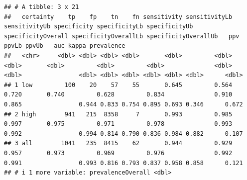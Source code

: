 \documentclass[
]{article}
\begin{document}
\begin{verbatim}
## # A tibble: 3 x 21
##   certainty    tp    fp    tn    fn sensitivity sensitivityLb sensitivityUb specificity specificityLb specificityUb specificityOverall specificityOverallLb specificityOverallUb   ppv ppvLb ppvUb   auc kappa prevalence
##   <chr>     <dbl> <dbl> <dbl> <dbl>       <dbl>         <dbl>         <dbl>       <dbl>         <dbl>         <dbl>              <dbl>                <dbl>                <dbl> <dbl> <dbl> <dbl> <dbl> <dbl>      <dbl>
## 1 low         100    20    57    55       0.645         0.564         0.720       0.740         0.628         0.834              0.910                0.865                0.944 0.833 0.754 0.895 0.693 0.346      0.672
## 2 high        941   215  8358     7       0.993         0.985         0.997       0.975         0.971         0.978              0.993                0.992                0.994 0.814 0.790 0.836 0.984 0.882      0.107
## 3 all        1041   235  8415    62       0.944         0.929         0.957       0.973         0.969         0.976              0.992                0.991                0.993 0.816 0.793 0.837 0.958 0.858      0.121
## # i 1 more variable: prevalenceOverall <dbl>
\end{verbatim}
\end{document}
